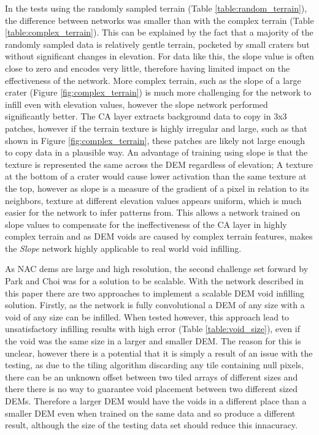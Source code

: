 \documentclass[twocolumn]{article}
\begin{document}
In the tests using the randomly sampled terrain (Table \ref{table:random_terrain}), the difference between networks was smaller than with the complex terrain (Table \ref{table:complex_terrain}).
This can be explained by the fact that a majority of the randomly sampled data is relatively gentle terrain, pocketed by small craters but without significant changes in elevation.
For data like this, the slope value is often close to zero and encodes very little, therefore having limited impact on the effectiveness of the network.
More complex terrain, such as the slope of a large crater (Figure \ref{fig:complex_terrain}) is much more challenging for the network to infill even with elevation values, however the slope network performed significantly better.
The CA layer extracts background data to copy in 3x3 patches, however if the terrain texture is highly irregular and large, such as that shown in Figure \ref{fig:complex_terrain}, these patches are likely not large enough to copy data in a plausible way.
An advantage of training using slope is that the texture is represented the same across the DEM regardless of elevation; A texture at the bottom of a crater would cause lower activation than the same texture at the top, however as slope is a measure of the gradient of a pixel in relation to its neighbors, texture at different elevation values appears uniform, which is much easier for the network to infer patterns from.
This allows a network trained on slope values to compensate for the ineffectiveness of the CA layer in highly complex terrain and as DEM voids are caused by complex terrain features, makes the \emph{Slope} network highly applicable to real world void infilling.

As NAC dems are large and high resolution, the second challenge set forward by Park and Choi was for a solution to be scalable.
With the network described in this paper there are two approaches to implement a scalable DEM void infilling solution.
Firstly, as the network is fully convolutional a DEM of any size with a void of any size can be infilled.
When tested however, this approach lead to unsatisfactory infilling results with high error (Table \ref{table:void_size}), even if the void was the same size in a larger and smaller DEM.
The reason for this is unclear, however there is a potential that it is simply a result of an issue with the testing, as due to the tiling algorithm discarding any tile containing null pixels, there can be an unknown offset between two tiled arrays of different sizes and there there is no way to guarantee void placement between two different sized DEMs.
Therefore a larger DEM would have the voids in a different place than a smaller DEM even when trained on the same data and so produce a different result, although the size of the testing data set should reduce this innacuracy.
\end{document}

